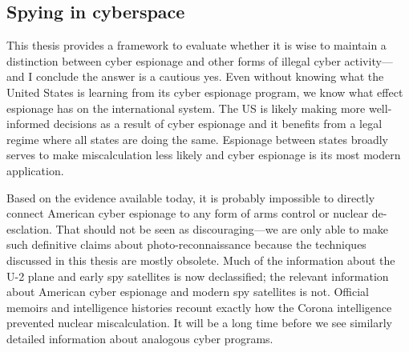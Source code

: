 \documentclass[11pt]{memoir}
\begin{document}

\subsection{Spying in cyberspace}
This thesis provides a framework to evaluate whether it is wise to maintain a distinction between cyber espionage and other forms of illegal cyber activity---and I conclude the answer is a cautious yes. Even without knowing what the United States is learning from its cyber espionage program, we know what effect espionage has on the international system. The US is likely making more well-informed decisions as a result of cyber espionage and it benefits from a legal regime where all states are doing the same. Espionage between states broadly serves to make miscalculation less likely and cyber espionage is its most modern application.

Based on the evidence available today, it is probably impossible to directly connect American cyber espionage to any form of arms control or nuclear de-esclation. That should not be seen as discouraging---we are only able to make such definitive claims about photo-reconnaissance because the techniques discussed in this thesis are mostly obsolete. Much of the information about the U-2 plane and early spy satellites is now declassified; the relevant information about American cyber espionage and modern spy satellites is not. Official memoirs and intelligence histories recount exactly how the Corona intelligence prevented nuclear miscalculation. It will be a long time before we see similarly detailed information about analogous cyber programs.
\end{document}
